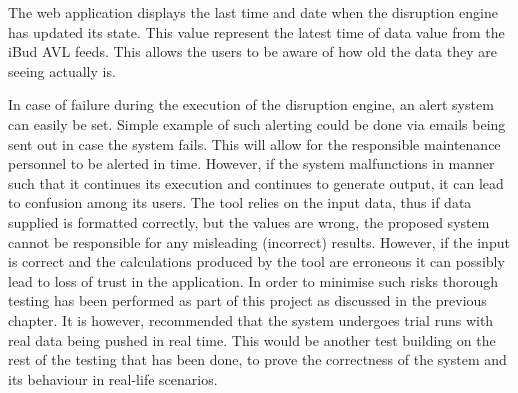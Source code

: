 The web application displays the last time and date when the disruption engine has updated its state. This value represent the latest time of data value from the iBud AVL feeds. This allows the users to be aware of how old the data they are seeing actually is.

In case of failure during the execution of the disruption engine, an alert system can easily be set. Simple example of such alerting could be done via emails being sent out in case the system fails. This will allow for the responsible maintenance personnel to be alerted in time. However, if the system malfunctions in manner such that it continues its execution and continues to generate output, it can lead to confusion among its users. The tool relies on the input data, thus if data supplied is formatted correctly, but the values are wrong, the proposed system cannot be responsible for any misleading (incorrect) results. However, if the input is correct and the calculations produced by the tool are erroneous it can possibly lead to loss of trust in the application. In order to minimise such risks thorough testing has been performed as part of this project as discussed in the previous chapter. It is however, recommended that the system undergoes trial runs with real data being pushed in real time. This would be another test building on the rest of the testing that has been done, to prove the correctness of the system and its behaviour in real-life scenarios.



